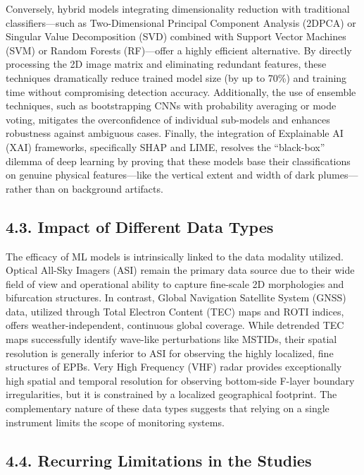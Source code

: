 Conversely, hybrid models integrating dimensionality reduction with
traditional classifiers---such as Two-Dimensional Principal Component
Analysis (2DPCA) or Singular Value Decomposition (SVD) combined with
Support Vector Machines (SVM) or Random Forests (RF)---offer a highly
efficient alternative. By directly processing the 2D image matrix and
eliminating redundant features, these techniques dramatically reduce
trained model size (by up to 70\%) and training time without
compromising detection accuracy. Additionally, the use of ensemble
techniques, such as bootstrapping CNNs with probability averaging or
mode voting, mitigates the overconfidence of individual sub-models and
enhances robustness against ambiguous cases. Finally, the integration of
Explainable AI (XAI) frameworks, specifically SHAP and LIME, resolves
the ``black-box'' dilemma of deep learning by proving that these models
base their classifications on genuine physical features---like the
vertical extent and width of dark plumes---rather than on background
artifacts.

\hypertarget{impact-of-different-data-types}{%
\subsection{4.3. Impact of Different Data
Types}\label{impact-of-different-data-types}}

The efficacy of ML models is intrinsically linked to the data modality
utilized. Optical All-Sky Imagers (ASI) remain the primary data source
due to their wide field of view and operational ability to capture
fine-scale 2D morphologies and bifurcation structures. In contrast,
Global Navigation Satellite System (GNSS) data, utilized through Total
Electron Content (TEC) maps and ROTI indices, offers
weather-independent, continuous global coverage. While detrended TEC
maps successfully identify wave-like perturbations like MSTIDs, their
spatial resolution is generally inferior to ASI for observing the highly
localized, fine structures of EPBs. Very High Frequency (VHF) radar
provides exceptionally high spatial and temporal resolution for
observing bottom-side F-layer boundary irregularities, but it is
constrained by a localized geographical footprint. The complementary
nature of these data types suggests that relying on a single instrument
limits the scope of monitoring systems.

\hypertarget{recurring-limitations-in-the-studies}{%
\subsection{4.4. Recurring Limitations in the
Studies}\label{recurring-limitations-in-the-studies}}

